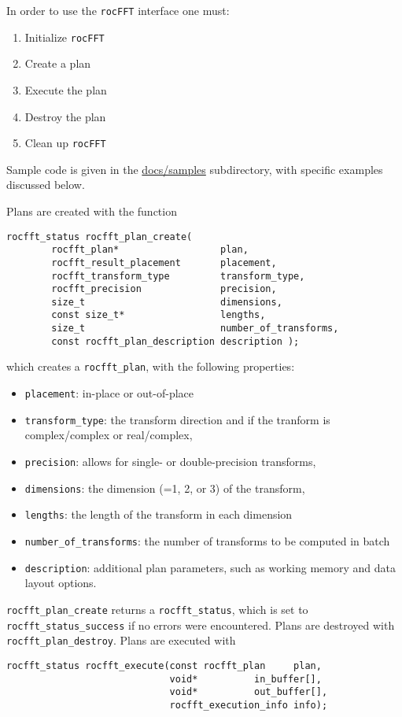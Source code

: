 \documentclass[10pt]{article}
\renewcommand{\(}{\left(}
\renewcommand{\)}{\right)}
\begin{document}
In order to use the \texttt{rocFFT} interface one must:
\begin{enumerate}
\item Initialize \texttt{rocFFT} 
\item Create a plan
\item Execute the plan
\item Destroy the plan
\item Clean up \texttt{rocFFT}
\end{enumerate}
Sample code is given in the \url{docs/samples} subdirectory, with
specific examples discussed below.

Plans are created with the function
\begin{lstlisting}
rocfft_status rocfft_plan_create(
        rocfft_plan*                  plan,
        rocfft_result_placement       placement,
        rocfft_transform_type         transform_type,
        rocfft_precision              precision,
        size_t                        dimensions,
        const size_t*                 lengths,
        size_t                        number_of_transforms,
        const rocfft_plan_description description );
\end{lstlisting}
which creates a \lstinline{rocfft_plan}, with the following properties:
\begin{itemize}
\item \lstinline{placement}: in-place or out-of-place
\item \lstinline{transform_type}: the transform
  direction and if the tranform is complex/complex or real/complex,
\item \lstinline{precision}: allows for single- or
  double-precision transforms,
\item \lstinline{dimensions}: the dimension (=1, 2, or 3) of the
  transform,
\item \lstinline{lengths}: the length of the transform in each dimension
\item \lstinline{number_of_transforms}: the number of transforms to be
  computed in batch
\item \lstinline{description}: additional plan parameters, such as
  working memory and data layout options.
\end{itemize}
\lstinline{rocfft_plan_create} returns a \lstinline{rocfft_status},
which is set to \lstinline{rocfft_status_success} if no errors were
encountered.  Plans are destroyed with
\lstinline{rocfft_plan_destroy}.  Plans are executed with
\begin{lstlisting}
rocfft_status rocfft_execute(const rocfft_plan     plan,
                             void*          in_buffer[],
                             void*          out_buffer[],
                             rocfft_execution_info info);
\end{lstlisting}
\end{document}

